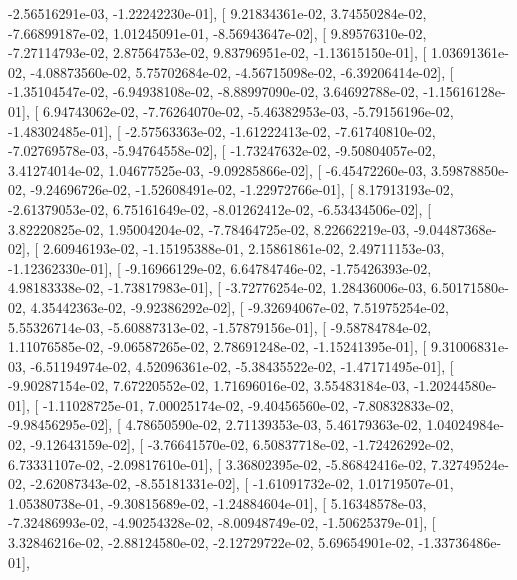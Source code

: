 \documentclass{article}
\begin{document}
         -2.56516291e-03,  -1.22242230e-01],
       [  9.21834361e-02,   3.74550284e-02,  -7.66899187e-02,
          1.01245091e-01,  -8.56943647e-02],
       [  9.89576310e-02,  -7.27114793e-02,   2.87564753e-02,
          9.83796951e-02,  -1.13615150e-01],
       [  1.03691361e-02,  -4.08873560e-02,   5.75702684e-02,
         -4.56715098e-02,  -6.39206414e-02],
       [ -1.35104547e-02,  -6.94938108e-02,  -8.88997090e-02,
          3.64692788e-02,  -1.15616128e-01],
       [  6.94743062e-02,  -7.76264070e-02,  -5.46382953e-03,
         -5.79156196e-02,  -1.48302485e-01],
       [ -2.57563363e-02,  -1.61222413e-02,  -7.61740810e-02,
         -7.02769578e-03,  -5.94764558e-02],
       [ -1.73247632e-02,  -9.50804057e-02,   3.41274014e-02,
          1.04677525e-03,  -9.09285866e-02],
       [ -6.45472260e-03,   3.59878850e-02,  -9.24696726e-02,
         -1.52608491e-02,  -1.22972766e-01],
       [  8.17913193e-02,  -2.61379053e-02,   6.75161649e-02,
         -8.01262412e-02,  -6.53434506e-02],
       [  3.82220825e-02,   1.95004204e-02,  -7.78464725e-02,
          8.22662219e-03,  -9.04487368e-02],
       [  2.60946193e-02,  -1.15195388e-01,   2.15861861e-02,
          2.49711153e-03,  -1.12362330e-01],
       [ -9.16966129e-02,   6.64784746e-02,  -1.75426393e-02,
          4.98183338e-02,  -1.73817983e-01],
       [ -3.72776254e-02,   1.28436006e-03,   6.50171580e-02,
          4.35442363e-02,  -9.92386292e-02],
       [ -9.32694067e-02,   7.51975254e-02,   5.55326714e-03,
         -5.60887313e-02,  -1.57879156e-01],
       [ -9.58784784e-02,   1.11076585e-02,  -9.06587265e-02,
          2.78691248e-02,  -1.15241395e-01],
       [  9.31006831e-03,  -6.51194974e-02,   4.52096361e-02,
         -5.38435522e-02,  -1.47171495e-01],
       [ -9.90287154e-02,   7.67220552e-02,   1.71696016e-02,
          3.55483184e-03,  -1.20244580e-01],
       [ -1.11028725e-01,   7.00025174e-02,  -9.40456560e-02,
         -7.80832833e-02,  -9.98456295e-02],
       [  4.78650590e-02,   2.71139353e-03,   5.46179363e-02,
          1.04024984e-02,  -9.12643159e-02],
       [ -3.76641570e-02,   6.50837718e-02,  -1.72426292e-02,
          6.73331107e-02,  -2.09817610e-01],
       [  3.36802395e-02,  -5.86842416e-02,   7.32749524e-02,
         -2.62087343e-02,  -8.55181331e-02],
       [ -1.61091732e-02,   1.01719507e-01,   1.05380738e-01,
         -9.30815689e-02,  -1.24884604e-01],
       [  5.16348578e-03,  -7.32486993e-02,  -4.90254328e-02,
         -8.00948749e-02,  -1.50625379e-01],
       [  3.32846216e-02,  -2.88124580e-02,  -2.12729722e-02,
          5.69654901e-02,  -1.33736486e-01],
\end{document}

